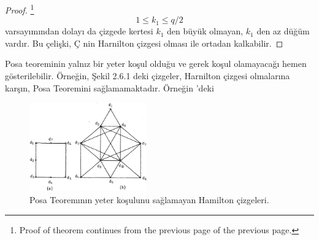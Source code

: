 \documentclass[11pt]{amsbook}
\begin{document}

\begin{theorem}
\begin{proof}\footnote{Proof of theorem continues from the previous page of the previous page.}
	\[
		1 \leq k_{1} \leq q/2
	\]
varsayımından dolayı da çizgede kertesi $k_{1}$ den büyük olmayan, $k_{1}$ den az düğüm vardır. Bu çelişki, $Ç$ nin Harnilton çizgesi olması ile ortadan kalkabilir.
\end{proof}
\end{theorem}


Posa teoreminin yalnız bir yeter koşul olduğu ve gerek koşul olamayacağı hemen gösterilebilir. Örneğin, Şekil 2.6.1 deki çizgeler, Harnilton çizgesi olmalarına karşın, Posa Teoremini sağlamamaktadır. Örneğin 'deki

\begin{figure}[htb]
	\centering
	\includegraphics[width=0.45\textwidth]{images/ceyhun-089-fig01.png}
	\caption{Posa Teoremının yeter koşulunu sağlamayan Hamilton çizgeleri.}
	\label{fig:PosaTheoremNotHamiltons}
\end{figure}
\end{document}
